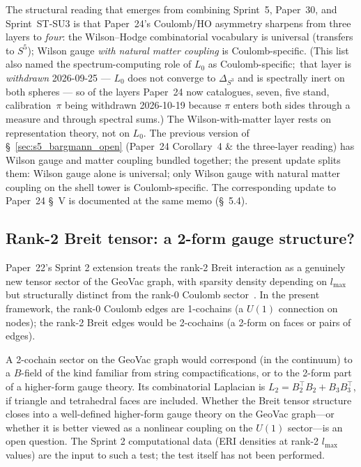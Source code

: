 \documentclass[aps,pra,twocolumn,superscriptaddress,longbibliography]{revtex4-2}
\begin{document}
The structural reading that emerges from combining Sprint~5,
Paper~30, and Sprint~ST-SU3 is that Paper~24's Coulomb/HO asymmetry
sharpens from three layers to \emph{four}: the Wilson--Hodge
combinatorial vocabulary is universal (transfers to $S^5$); Wilson
gauge \emph{with natural matter coupling} is Coulomb-specific.  (This list also named the spectrum-computing
role of $L_0$ as Coulomb-specific;\ that layer is \emph{withdrawn}
2026-09-25 --- $L_0$ does not converge to $\Delta_{S^3}$ and is
spectrally inert on both spheres --- so of the layers Paper~24 now
catalogues, seven, five stand, calibration~$\pi$ being withdrawn
2026-10-19 because $\pi$ enters both sides through a measure and
through spectral sums.)  The Wilson-with-matter layer rests on
representation theory, not on $L_0$.
The previous version of \S~\ref{sec:s5_bargmann_open} (Paper~24
Corollary~4 \& the three-layer reading) has Wilson gauge and matter
coupling bundled together; the present update splits them: Wilson
gauge alone is universal; only Wilson gauge with natural matter
coupling on the shell tower is Coulomb-specific.  The corresponding
update to Paper~24 \S~V is documented at the same memo (\S~5.4).

\subsection{Rank-2 Breit tensor: a 2-form gauge structure?}

Paper~22's Sprint 2 extension treats the rank-2 Breit interaction as
a genuinely new tensor sector of the GeoVac graph, with sparsity
density depending on $l_{\max}$ but structurally distinct from the
rank-0 Coulomb sector~\cite{Paper22}.  In the present framework, the
rank-0 Coulomb edges are 1-cochains (a $U(1)$ connection on nodes);
the rank-2 Breit edges would be 2-cochains (a 2-form on faces or
pairs of edges).

A 2-cochain sector on the GeoVac graph would correspond (in the
continuum) to a $B$-field of the kind familiar from string
compactifications, or to the 2-form part of a higher-form gauge
theory.  Its combinatorial Laplacian is $L_2 = B_2^{\top} B_2 +
B_3 B_3^{\top}$, if triangle and tetrahedral faces are included.
Whether the Breit tensor structure closes into a well-defined
higher-form gauge theory on the GeoVac graph---or whether it is
better viewed as a nonlinear coupling on the $U(1)$ sector---is an
open question.  The Sprint 2 computational data (ERI densities at
rank-2 $l_{\max}$ values) are the input to such a test; the test
itself has not been performed.
\end{document}
